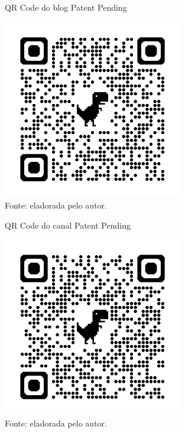 \label{ap:B}

    \begin{figure}[h!]
        \captionsetup{width=1\textwidth} 
        \caption{\label{fig:qr_bog} QR Code do blog Patent Pending }
        \centering
        \includegraphics[width=0.7\textwidth]{figuras/qr_bog.png} 
        \caption*{Fonte: eladorada pelo autor.}
    \end{figure}

        \begin{figure}[h!]
        \captionsetup{width=1\textwidth} 
        \caption{\label{fig:qr_canal} QR Code do canal Patent Pending }
        \centering
        \includegraphics[width=0.7\textwidth]{figuras/qr_canal.png} 
        \caption*{Fonte: eladorada pelo autor.}
    \end{figure}


